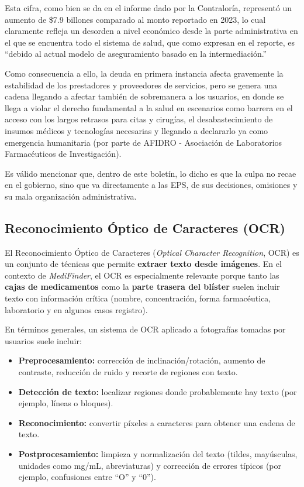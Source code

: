 Esta cifra, como bien se da en el informe dado por la Contraloría, representó un aumento de \$7.9 billones comparado al monto reportado en 2023, lo cual claramente refleja un desorden a nivel económico desde la parte administrativa en el que se encuentra todo el sistema de salud, que como expresan en el reporte, es ``debido al actual modelo de aseguramiento basado en la intermediación.'' \cite{minsalud2025}

Como consecuencia a ello, la deuda en primera instancia afecta gravemente la estabilidad de los prestadores y proveedores de servicios, pero se genera una cadena llegando a afectar también de sobremanera a los usuarios, en donde se llega a violar el derecho fundamental a la salud en escenarios como barrera en el acceso con los largos retrasos para citas y cirugías, el desabastecimiento de insumos médicos y tecnologías necesarias y llegando a declararlo ya como emergencia humanitaria (por parte de AFIDRO - Asociación de Laboratorios Farmacéuticos de Investigación).

Es válido mencionar que, dentro de este boletín, lo dicho es que la culpa no recae en el gobierno, sino que va directamente a las EPS, de sus decisiones, omisiones y su mala organización administrativa.

\subsection{Reconocimiento Óptico de Caracteres (OCR)}

El Reconocimiento Óptico de Caracteres (\textit{Optical Character Recognition}, OCR) es un conjunto de técnicas que permite \textbf{extraer texto desde imágenes}. En el contexto de \textit{MediFinder}, el OCR es especialmente relevante porque tanto las \textbf{cajas de medicamentos} como la \textbf{parte trasera del blíster} suelen incluir texto con información crítica (nombre, concentración, forma farmacéutica, laboratorio y en algunos casos registro).

En términos generales, un sistema de OCR aplicado a fotografías tomadas por usuarios suele incluir:
\begin{itemize}
	\item \textbf{Preprocesamiento:} corrección de inclinación/rotación, aumento de contraste, reducción de ruido y recorte de regiones con texto.
	\item \textbf{Detección de texto:} localizar regiones donde probablemente hay texto (por ejemplo, líneas o bloques).
	\item \textbf{Reconocimiento:} convertir píxeles a caracteres para obtener una cadena de texto.
	\item \textbf{Postprocesamiento:} limpieza y normalización del texto (tildes, mayúsculas, unidades como mg/mL, abreviaturas) y corrección de errores típicos (por ejemplo, confusiones entre ``O'' y ``0'').
\end{itemize}

